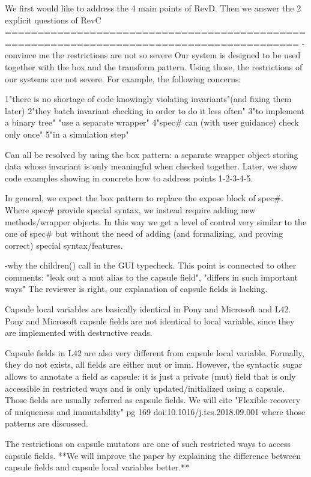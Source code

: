  We first would like to address the 4 main points of RevD.
Then we answer the 2 explicit questions of RevC
===========================================================================================
-convince me the restrictions are not so severe
Our system is designed to be used together with the box and the transform pattern.
Using those, the restrictions of our systems are not severe.
For example, the following concerns:

1"there is no shortage of code knowingly violating invariants"(and fixing them later)
2"they batch invariant checking in order to do it less often"
3"to implement a binary tree" "use a separate wrapper"
4"spec# can (with user guidance) check only once"
5"in a simulation step"

Can all be resolved by using the box pattern: a separate wrapper object storing data
whose invariant is only meaningful when checked together.
Later, we show code examples showing in concrete how to address points 1-2-3-4-5.

In general, we expect the box pattern to replace the expose block of spec#.
Where spec# provide special syntax, we instead require adding new methods/wrapper
objects. In this way we get a level of control very similar to the one of spec# but
without the need of adding (and formalizing, and proving correct) special syntax/features.

-why the children() call in the GUI typecheck.
This point is connected to other comments:
 "leak out a mut alias to the capsule field", "differs in such important ways"
The reviewer is right, our explanation of capsule fields is lacking.

Capsule local variables are basically identical in Pony and Microsoft and L42.
Pony and Microsoft capsule fields are not identical to local variable, since they are 
implemented with destructive reads.

Capsule fields in L42 are also very different from capsule local variable.
Formally, they do not exists, all fields are either mut or imm.
However, the syntactic sugar allows to annotate a field as capsule:
it is just a private (mut) field that is only
accessible in restricted ways and is only updated/initialized using a capsule.
Those fields are usually referred as capsule fields.
We will cite "Flexible recovery of uniqueness and immutability" 
pg 169 doi:10.1016/j.tcs.2018.09.001 where those patterns are discussed.

The restrictions on capsule mutators are one of such restricted ways to access capsule fields.
**We will improve the paper by explaining the difference between capsule fields and capsule 
local variables better.**

